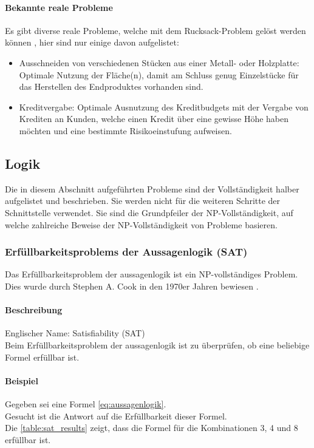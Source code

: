	\paragraph{Bekannte reale Probleme}	
	Es gibt diverse reale Probleme, welche mit dem Rucksack-Problem gelöst werden können \cite{kellerer2004knapsack}, hier sind nur einige davon aufgelistet:
	\begin{itemize}
		\item Ausschneiden von verschiedenen Stücken aus einer Metall- oder Holzplatte: Optimale Nutzung der Fläche(n), damit am Schluss genug Einzelstücke für das Herstellen 
			des Endproduktes vorhanden sind.
		\item Kreditvergabe: Optimale Ausnutzung des Kreditbudgets mit der Vergabe von Krediten an Kunden, welche einen Kredit über eine gewisse Höhe haben möchten und eine 
			bestimmte Risikoeinstufung aufweisen.
	\end{itemize}


\newpage
\subsection{Logik}\label{logic}
Die in diesem Abschnitt aufgeführten Probleme sind der Vollständigkeit halber aufgelistet und beschrieben. Sie werden nicht für die weiteren Schritte der Schnittstelle verwendet. Sie sind die 
Grundpfeiler der NP-Vollständigkeit, auf welche zahlreiche Beweise der NP-Vollständigkeit von Probleme basieren.

	\subsubsection{Erfüllbarkeitsproblems der Aussagenlogik (SAT)}\label{sat}
	Das Erfüllbarkeitsproblem der \gls{aussagenlogik} ist ein NP-vollständiges Problem. Dies wurde durch Stephen A. Cook in den 1970er Jahren bewiesen \cite{cook_complexity}.

	\paragraph{Beschreibung}
	Englischer Name: Satisfiability (SAT)\\
	Beim Erfüllbarkeitsproblem der \gls{aussagenlogik} ist zu überprüfen, ob eine beliebige  Formel erfüllbar ist.	

	\paragraph{Beispiel} Gegeben sei eine  Formel \ref{eq:aussagenlogik}.\\
	Gesucht ist die Antwort auf die Erfüllbarkeit dieser Formel.\\
	Die \autoref{table:sat_results} zeigt, dass die Formel für die Kombinationen 3, 4 und 8 erfüllbar ist.


